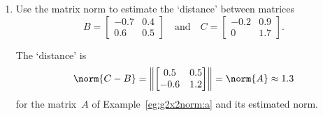 \begin{example} \label{eg:}
\begin{enumerate}
\item Use the matrix norm to estimate the `distance' between matrices
\begin{equation*}
B=\begin{bmatrix} {-0.7}&{0.4}\\{0.6}&{0.5} \end{bmatrix}
\quad\text{and}\quad
C=\begin{bmatrix} -0.2&0.9\\0&1.7 \end{bmatrix}.
\end{equation*}
\begin{solution} 
The `distance' is
\begin{equation*}
\norm{C-B}=\left\|\begin{bmatrix} 0.5&0.5\\-0.6&1.2 \end{bmatrix}\right\|
=\norm{A}\approx 1.3
\end{equation*}
for the matrix~\(A\) of Example~\ref{eg:g2x2norm:a} and its estimated norm.
\end{solution}



\end{enumerate}
\end{example}
